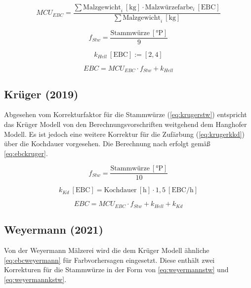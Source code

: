 \documentclass[a4paper,parskip=half]{scrartcl}
\newcommand{\MCUEBC}{\mathit{MCU}_{EBC}}
\newcommand{\EBC}{\mathit{EBC}}
\newcommand{\uebc}{\:[\textrm{EBC}]}
\newcommand{\uebch}{\:[\textrm{EBC/h}]}
\newcommand{\ukg}{\:[\textrm{kg}]}
\newcommand{\uplato}{\:[\textrm{°P}]}
\newcommand{\fstw}{f_{Stw}}
\newcommand{\khell}{k_{Hell}}
\newcommand{\kkd}{k_{Kd}}
\newcommand{\uhour}{\:[\textrm{h}]}
\begin{document}
\begin{equation}
\MCUEBC = \frac{\sum \text{Malzgewicht}_i \ukg \cdot \text{Malzwürzefarbe}_i \uebc}{\sum \text{Malzgewicht}_i \ukg} 
\label{eq:mcubasisebc}
\end{equation}

\begin{equation}
\fstw = \frac{\text{Stammwürze} \uplato}{9}
\label{eq:hanghoferfstw}
\end{equation}

\begin{equation}
\khell \uebc := \left[2, 4 \right]
\label{eq:hanghoferhell}
\end{equation}

\begin{equation}
\EBC = \MCUEBC \cdot \fstw + \khell
\label{eq:ebchanghofer}
\end{equation}

\subsection*{Krüger (2019)}

Abgesehen vom Korrekturfaktor für die Stammwürze (\autoref{eq:krugerstw}) entspricht das Krüger Modell von den Berechnungsvorschriften weitgehend dem Hanghofer Modell. Es ist jedoch eine weitere Korrektur für die Zufärbung (\autoref{eq:krugerkkd}) über die Kochdauer vorgesehen. Die Berechnung nach \textcite{Krueger2019} erfolgt gemäß \autoref{eq:ebckruger}.

\begin{equation}
\fstw = \frac{\text{Stammwürze} \uplato}{10}
\label{eq:krugerstw}
\end{equation}

\begin{equation}
\kkd \uebc = \text{Kochdauer} \uhour \cdot 1,5 \uebch
\label{eq:krugerkkd}
\end{equation}

\begin{equation}
\EBC = \MCUEBC \cdot \fstw + \khell + \kkd
\label{eq:ebckruger}
\end{equation}

\subsection*{Weyermann (2021)}

Von der Weyermann Mälzerei wird die dem Krüger Modell ähnliche \autoref{eq:ebcweyermann} für Farbvorhersagen eingesetzt. Diese enthält zwei Korrekturen für die Stammwürze in der Form von \autoref{eq:weyermannstw} und \autoref{eq:weyermannkstw}. \parencite{KrausWeyermann2021b}
\end{document}
